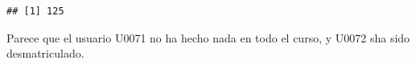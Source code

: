 \documentclass[]{elsarticle} %
\newenvironment{Shaded}{\begin{snugshade}}{\end{snugshade}}
\newcommand{\FunctionTok}[1]{\textcolor[rgb]{0.13,0.29,0.53}{\textbf{#1}}}
\newcommand{\NormalTok}[1]{#1}
\newcommand{\SpecialCharTok}[1]{\textcolor[rgb]{0.81,0.36,0.00}{\textbf{#1}}}
\begin{document}
\begin{Shaded}
\end{Shaded}

\begin{verbatim}
## [1] 125
\end{verbatim}

Parece que el usuario U0071 no ha hecho nada en todo el curso, y U0072
sha sido desmatriculado.
\end{document}
